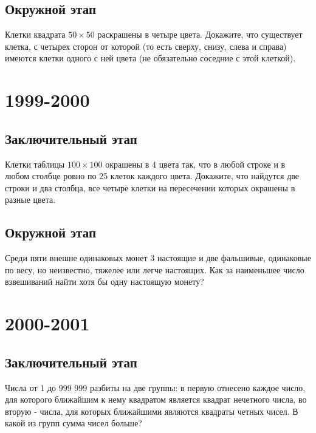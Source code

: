 \documentclass[11pt, a4paper]{common/document_template}
\begin{document}
\section{Окружной этап}

\begin{exercise}
Клетки квадрата $50 \times 50$ раскрашены в четыре цвета. Докажите, что существует клетка, с четырех сторон от которой (то есть сверху, снизу, слева и справа) имеются клетки одного с ней цвета (не обязательно соседние с этой клеткой).
\end{exercise}

\chapter{1999-2000}

\section{Заключительный этап}

\begin{exercise}
Клетки таблицы $100 \times 100$ окрашены в 4 цвета так, что в любой
строке и в любом столбце ровно по 25 клеток каждого цвета. Докажите, что найдутся две строки и два столбца, все четыре клетки на пересечении которых окрашены в разные цвета.
\end{exercise}

\section{Окружной этап}

\begin{exercise}
Среди пяти внешне одинаковых монет 3 настоящие и две фальшивые, одинаковые по весу, но неизвестно, тяжелее или легче настоящих. Как за наименьшее число взвешиваний найти хотя бы одну настоящую монету?
\end{exercise}

\chapter{2000-2001}

\section{Заключительный этап}

\begin{exercise}
Числа от 1 до 999 999 разбиты на две группы: в первую отнесено каждое число, для которого ближайшим к нему квадратом является квадрат нечетного числа, во вторую - числа, для которых ближайшими являются квадраты четных чисел. В какой из групп сумма чисел больше?
\end{exercise}
\end{document}
